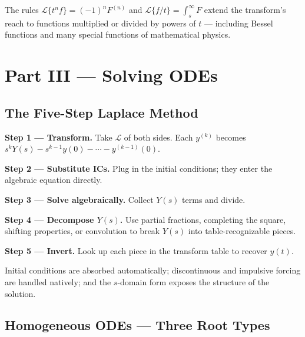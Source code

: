\documentclass[11pt]{article}
\begin{document}
\begin{conceptbox}
The rules \textcolor{accentorange}{$\mathcal{L}\{t^n f\} = (-1)^n F^{(n)}$} and \textcolor{accentorange}{$\mathcal{L}\{f/t\} = \int_s^\infty F$} extend the transform's reach to functions multiplied or divided by powers of $t$ --- including Bessel functions and many special functions of mathematical physics.
\end{conceptbox}

\clearpage
{}
{}
\section*{Part III --- Solving ODEs}
\setcounter{section}{3}
\setcounter{subsection}{0}

\subsection{The Five-Step Laplace Method}

\begin{methodbox}
\textbf{Step 1 --- Transform.} Take $\mathcal{L}$ of both sides. Each $y^{(k)}$ becomes $s^k Y(s) - s^{k-1}y(0) - \cdots - y^{(k-1)}(0)$.

\textbf{Step 2 --- Substitute ICs.} Plug in the initial conditions; they enter the algebraic equation directly.

\textbf{Step 3 --- Solve algebraically.} Collect $Y(s)$ terms and divide.

\textbf{Step 4 --- Decompose $Y(s)$.} Use partial fractions, completing the square, shifting properties, or convolution to break $Y(s)$ into table-recognizable pieces.

\textbf{Step 5 --- Invert.} Look up each piece in the transform table to recover $y(t)$.
\end{methodbox}

\begin{conceptbox}
\textcolor{accentorange}{Initial conditions are absorbed automatically}; \textcolor{accentorange}{discontinuous and impulsive forcing are handled natively}; and the $s$-domain form exposes the structure of the solution.
\end{conceptbox}

\subsection{Homogeneous ODEs --- Three Root Types}
\end{document}
